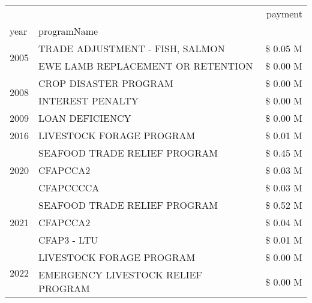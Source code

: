 \begin{tabular}{llr}
\toprule
 &  & payment \\
year & programName &  \\
\midrule
\multirow[t]{2}{*}{2005} & TRADE ADJUSTMENT - FISH, SALMON & \$ 0.05 M \\
 & EWE LAMB REPLACEMENT OR RETENTION & \$ 0.00 M \\
\cline{1-3}
\multirow[t]{2}{*}{2008} & CROP DISASTER PROGRAM & \$ 0.00 M \\
 & INTEREST PENALTY & \$ 0.00 M \\
\cline{1-3}
2009 & LOAN DEFICIENCY & \$ 0.00 M \\
\cline{1-3}
2016 & LIVESTOCK FORAGE PROGRAM & \$ 0.01 M \\
\cline{1-3}
\multirow[t]{3}{*}{2020} & SEAFOOD TRADE RELIEF PROGRAM & \$ 0.45 M \\
 & CFAPCCA2 & \$ 0.03 M \\
 & CFAPCCCCA & \$ 0.03 M \\
\cline{1-3}
\multirow[t]{3}{*}{2021} & SEAFOOD TRADE RELIEF PROGRAM & \$ 0.52 M \\
 & CFAPCCA2 & \$ 0.04 M \\
 & CFAP3 - LTU & \$ 0.01 M \\
\cline{1-3}
\multirow[t]{2}{*}{2022} & LIVESTOCK FORAGE PROGRAM & \$ 0.00 M \\
 & EMERGENCY LIVESTOCK RELIEF PROGRAM & \$ 0.00 M \\
\cline{1-3}
\bottomrule
\end{tabular}
